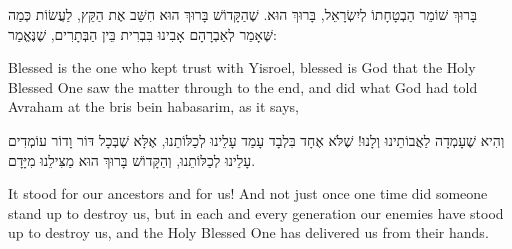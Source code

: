 \vspace{2em}

בָּרוּךְ שׁוֹמֵר הַבְטָחָתוֹ לְיִשְׂרָאֵל, בָּרוּךְ הוּא. שֶׁהַקָּדוֹשׁ בָּרוּךְ הוּא חִשַּׁב אֶת הַקֵּץ, לַעֲשׂוֹת כְּמַה שֶּׁאָמַר לְאַבְרָהָם אָבִינוּ בִּבְרִית בֵּין הַבְּתָרִים, שֶׁנֶּאֱמַר: 

\begin{english}
Blessed is the one who kept trust with Yisroel, blessed is God that the Holy Blessed One saw the matter through to the end, and did what God had told Avraham at the bris bein habasarim, as it says, 
\end{english}


וְהִיא שֶׁעָמְדָה לַאֲבוֹתֵינוּ וְלָנוּ! שֶׁלֹּא אֶחָד בִּלְבָד עָמַד עָלֵינוּ לְכַלּוֹתֵנוּ, אֶלָּא שֶׁבְּכָל דּוֹר וָדוֹר עוֹמְדִים עָלֵינוּ לְכַלּוֹתֵנוּ, וְהַקָּדוֹשׁ בָּרוּךְ הוּא מַצִּילֵנוּ מִיָּדָם.

\begin{english}
It stood for our ancestors and for us! And not just once one time did someone stand up to destroy us, but in each and every generation our enemies have stood up to destroy us, and the Holy Blessed One has delivered us from their hands.
\end{english}


\break

\begin{center}
{\large \bfseries \textcolor{light-gray}{}}
\end{center}


